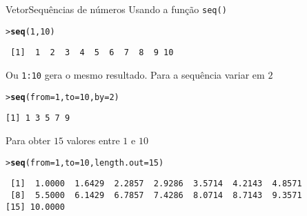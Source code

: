 \documentclass[10pt,handout]{beamer}\usepackage{graphicx, color}
\makeatletter
\newcommand{\hlfunctioncall}[1]{\textcolor[rgb]{0,0,0.545098039215686}{\textbf{#1}}}%
\newenvironment{kframe}{%
 \def\at@end@of@kframe{}%
 \ifinner\ifhmode%
  \def\at@end@of@kframe{\end{minipage}}%
  \begin{minipage}{\columnwidth}%
 \fi\fi%
 \def\FrameCommand##1{\hskip\@totalleftmargin \hskip-\fboxsep
 \colorbox{shadecolor}{##1}\hskip-\fboxsep
     \hskip-\linewidth \hskip-\@totalleftmargin \hskip\columnwidth}%
 \MakeFramed {\advance\hsize-\width
   \@totalleftmargin\z@ \linewidth\hsize
   \@setminipage}}%
 {\par\unskip\endMakeFramed%
 \at@end@of@kframe}
\newenvironment{knitrout}{}{} %
\makeatother
\begin{document}
\begin{frame}[fragile=singleslide]{Vetor}{Sequências de números}
  Usando a função \verb|seq()|
\begin{knitrout}\small
{}\color{fgcolor}\begin{kframe}
\begin{alltt}
> \hlfunctioncall{seq}(1, 10)
\end{alltt}
\begin{verbatim}
 [1]  1  2  3  4  5  6  7  8  9 10
\end{verbatim}
\end{kframe}
\end{knitrout}

Ou \verb|1:10| gera o mesmo resultado. Para a sequência variar em $2$
\begin{knitrout}\small
{}\color{fgcolor}\begin{kframe}
\begin{alltt}
> \hlfunctioncall{seq}(from = 1, to = 10, by = 2)
\end{alltt}
\begin{verbatim}
[1] 1 3 5 7 9
\end{verbatim}
\end{kframe}
\end{knitrout}

Para obter $15$ valores entre $1$ e $10$
\begin{knitrout}\small
{}\color{fgcolor}\begin{kframe}
\begin{alltt}
> \hlfunctioncall{seq}(from = 1, to = 10, length.out = 15)
\end{alltt}
\begin{verbatim}
 [1]  1.0000  1.6429  2.2857  2.9286  3.5714  4.2143  4.8571
 [8]  5.5000  6.1429  6.7857  7.4286  8.0714  8.7143  9.3571
[15] 10.0000
\end{verbatim}
\end{kframe}
\end{knitrout}

\end{frame}
\end{document}
